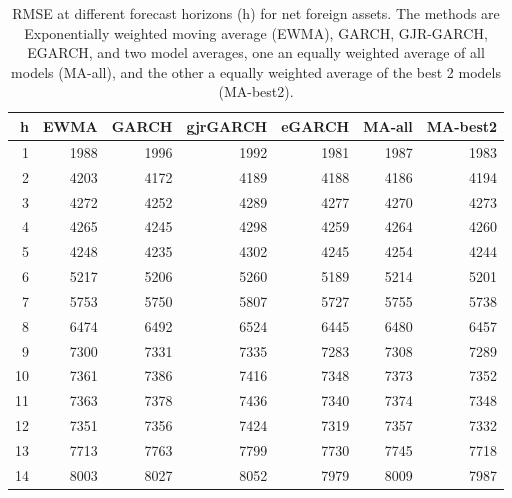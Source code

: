\documentclass{article}
\begin{document}
\begin{table}[ht]
\centering
\begin{tabular}{rrrrrrr}
  \hline
h & EWMA & GARCH & gjrGARCH & eGARCH & MA-all & MA-best2 \\ 
  \hline
1 & 1988 & 1996 & 1992 & 1981 & 1987 & 1983 \\ 
  2 & 4203 & 4172 & 4189 & 4188 & 4186 & 4194 \\ 
  3 & 4272 & 4252 & 4289 & 4277 & 4270 & 4273 \\ 
  4 & 4265 & 4245 & 4298 & 4259 & 4264 & 4260 \\ 
  5 & 4248 & 4235 & 4302 & 4245 & 4254 & 4244 \\ 
  6 & 5217 & 5206 & 5260 & 5189 & 5214 & 5201 \\ 
  7 & 5753 & 5750 & 5807 & 5727 & 5755 & 5738 \\ 
  8 & 6474 & 6492 & 6524 & 6445 & 6480 & 6457 \\ 
  9 & 7300 & 7331 & 7335 & 7283 & 7308 & 7289 \\ 
  10 & 7361 & 7386 & 7416 & 7348 & 7373 & 7352 \\ 
  11 & 7363 & 7378 & 7436 & 7340 & 7374 & 7348 \\ 
  12 & 7351 & 7356 & 7424 & 7319 & 7357 & 7332 \\ 
  13 & 7713 & 7763 & 7799 & 7730 & 7745 & 7718 \\ 
  14 & 8003 & 8027 & 8052 & 7979 & 8009 & 7987 \\ 
   \hline
\end{tabular}
\caption{RMSE at different forecast horizons (h) for net foreign assets. The methods are Exponentially weighted moving average (EWMA), GARCH, GJR-GARCH, EGARCH, and two model averages, one an equally weighted average of all models (MA-all), and the other a equally weighted average of the best 2 models (MA-best2).} 
\label{tab:rmsenfa}
\end{table}
\end{document}
